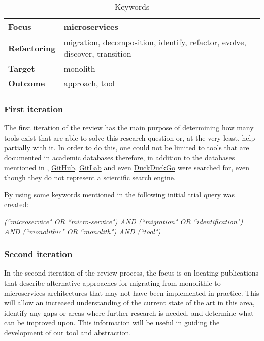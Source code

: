 \begin{table}[!htb] \caption{Keywords} \label{tab:keywords}
  \begin{center}
    \begin{tabular}[c]{p{7em}|p{13em}} {\textbf{Focus}} & microservices \\
      \hline \textbf{Refactoring} & {migration, decomposition, identify, refactor, evolve, discover, transition } \\
      \hline \textbf{Target} & monolith \\
      \hline \textbf{Outcome} & approach, tool \\
    \end{tabular}
  \end{center}
\end{table}

\subsubsection*{First iteration} \label{subsub:first-iteration}

The first iteration of the review has the main purpose of determining how many
tools exist that are able to solve this research question or, at the very
least, help partially with it. In order to do this, one could not be limited to
tools that are documented in academic databases therefore, in addition to the
databases mentioned in ,
\href{https://github.com}{GitHub}, \href{https://gitlab.com}{GitLab} and even
\href{https://duckduckgo.org}{DuckDuckGo} were searched for, even though they
do not represent a scientific search engine.

By using some keywords mentioned in  the following
initial trial query was created:

\begin{center}
  \emph{(``microservice" OR ``micro-service") AND (``migration" OR
  ``identification") AND (``monolithic" OR ``monolith") AND (``tool")}
\end{center}

\subsubsection*{Second iteration} \label{subsub:second-iteration}

In the second iteration of the review process, the focus is on locating
publications that describe alternative approaches for migrating from monolithic
to microservices architectures that may not have been implemented in practice.
This will allow an increased understanding of the current state of the art in
this area, identify any gaps or areas where further research is needed, and
determine what can be improved upon. This information will be useful in guiding
the development of our tool and abstraction.

